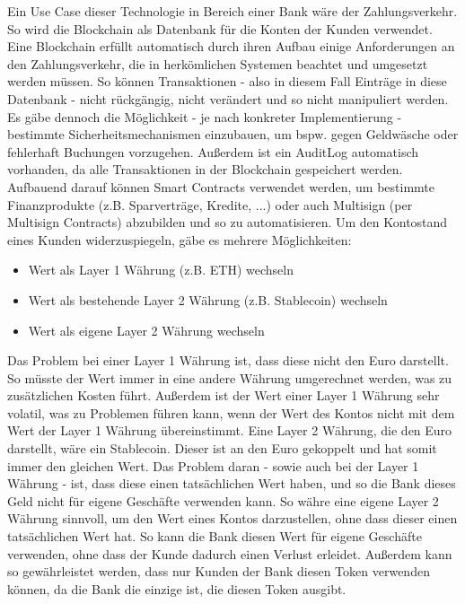 Ein Use Case dieser Technologie in Bereich einer Bank wäre der Zahlungsverkehr. So wird die Blockchain als Datenbank für die Konten der Kunden verwendet.
Eine Blockchain erfüllt automatisch durch ihren Aufbau einige Anforderungen an den Zahlungsverkehr, die in herkömlichen Systemen beachtet und umgesetzt werden müssen. So können Transaktionen - also in diesem Fall Einträge in diese Datenbank - nicht rückgängig, nicht verändert und so nicht manipuliert werden. Es gäbe dennoch die Möglichkeit - je nach konkreter Implementierung - bestimmte Sicherheitsmechanismen einzubauen, um bspw. gegen Geldwäsche oder fehlerhaft Buchungen vorzugehen. %
Außerdem ist ein AuditLog automatisch vorhanden, da alle Transaktionen in der Blockchain gespeichert werden.
Aufbauend darauf können Smart Contracts verwendet werden, um bestimmte Finanzprodukte (z.B. Sparverträge, Kredite, ...) oder auch Multisign (per Multisign Contracts) abzubilden und so zu automatisieren. %
Um den Kontostand eines Kunden widerzuspiegeln, gäbe es mehrere Möglichkeiten:
\begin{itemize}
    \item Wert als Layer 1 Währung (z.B. ETH) wechseln
    \item Wert als bestehende Layer 2 Währung (z.B. Stablecoin) wechseln
    \item Wert als eigene Layer 2 Währung wechseln
\end{itemize}
Das Problem bei einer Layer 1 Währung ist, dass diese nicht den Euro darstellt. So müsste der Wert immer in eine andere Währung umgerechnet werden, was zu zusätzlichen Kosten führt. Außerdem ist der Wert einer Layer 1 Währung sehr volatil, was zu Problemen führen kann, wenn der Wert des Kontos nicht mit dem Wert der Layer 1 Währung übereinstimmt.
Eine Layer 2 Währung, die den Euro darstellt, wäre ein Stablecoin. Dieser ist an den Euro gekoppelt und hat somit immer den gleichen Wert. 
Das Problem daran - sowie auch bei der Layer 1 Währung - ist, dass diese einen tatsächlichen Wert haben, und so die Bank dieses Geld nicht für eigene Geschäfte verwenden kann.
So währe eine eigene Layer 2 Währung sinnvoll, um den Wert eines Kontos darzustellen, ohne dass dieser einen tatsächlichen Wert hat. So kann die Bank diesen Wert für eigene Geschäfte verwenden, ohne dass der Kunde dadurch einen Verlust erleidet. Außerdem kann so gewährleistet werden, dass nur Kunden der Bank diesen Token verwenden können, da die Bank die einzige ist, die diesen Token ausgibt.
\bigbreak